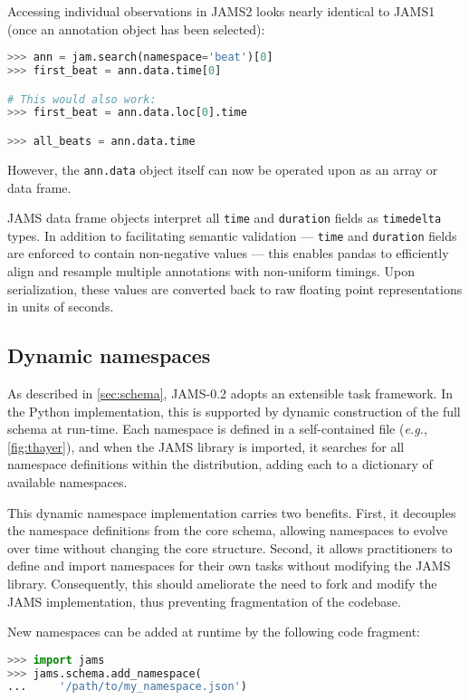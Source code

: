 \documentclass{article}
\begin{document}
Accessing individual observations in JAMS2 looks nearly identical to JAMS1
(once an annotation object has been selected):
\begin{lstlisting}[language=python]
>>> ann = jam.search(namespace='beat')[0]
>>> first_beat = ann.data.time[0]

# This would also work:
>>> first_beat = ann.data.loc[0].time

>>> all_beats = ann.data.time
\end{lstlisting}
However, the \texttt{ann.data} object itself can now be operated upon as an array or
data frame.

JAMS data frame objects interpret all \texttt{time} and \texttt{duration} fields as
\texttt{timedelta} types.  In addition to facilitating semantic validation ---
\texttt{time} and \texttt{duration} fields are enforced to contain non-negative values --- 
this enables pandas to efficiently align and resample multiple annotations with 
non-uniform timings.  Upon serialization, these values are converted back to raw floating
point representations in units of seconds.


\subsection{Dynamic namespaces}\label{sec:imp:namespaces}
As described in \cref{sec:schema}, JAMS-0.2 adopts an extensible task framework.
In the Python implementation, this is supported by dynamic construction of the full
schema at run-time.
Each namespace is defined in a self-contained file (\emph{e.g.}, \cref{fig:thayer}), and
when the JAMS library is imported, it searches for all namespace definitions within the
distribution, adding each to a dictionary of available namespaces.

This dynamic namespace implementation carries two benefits.  First, it decouples the
namespace definitions from the core schema, allowing namespaces to evolve over
time without changing the core structure.  Second, it allows practitioners to define and
import namespaces for their own tasks without modifying the JAMS library.  Consequently,
this should ameliorate the need to fork and modify the JAMS implementation, thus
preventing fragmentation of the codebase.

New namespaces can be added at runtime by the following code fragment:
\begin{lstlisting}[language=python]
>>> import jams
>>> jams.schema.add_namespace(
...     '/path/to/my_namespace.json')
\end{lstlisting}
\end{document}
